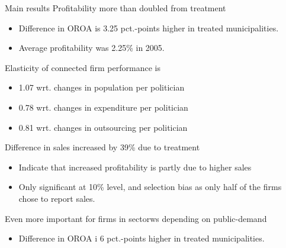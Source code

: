 \documentclass[8pt]{beamer}
\begin{document}
\begin{frame}{Main results}
  Profitability more than doubled from treatment
  \begin{itemize}
    \item Difference in OROA is 3.25 pct.-points higher in treated municipalities.
    \item Average profitability was 2.25\% in 2005.
  \end{itemize}
  Elasticity of connected firm performance is
  \begin{itemize}
    \item 1.07 wrt. changes in population per politician
    \item 0.78 wrt. changes in expenditure per politician
    \item 0.81 wrt. changes in outsourcing per politician
  \end{itemize}
  Difference in sales increased by 39\% due to treatment
  \begin{itemize}
    \item Indicate that increased profitability is partly due to higher sales
    \item Only significant at 10\% level, and selection bias as only half of the firms chose to report sales.
  \end{itemize}
  Even more important for firms in sectorws depending on public-demand
  \begin{itemize}
    \item Difference in OROA i 6 pct.-points higher in treated municipalities.
  \end{itemize}
\end{frame}
\end{document}
